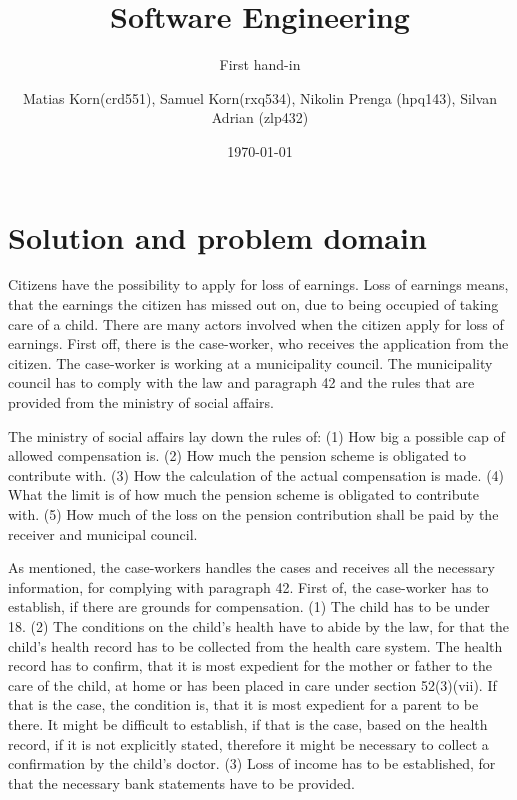 \documentclass{article}
\title{Software Engineering}
\subtitle{First hand-in}
\author{Matias Korn(crd551), Samuel Korn(rxq534), Nikolin Prenga (hpq143), Silvan Adrian (zlp432)}
\date{\today}
\begin{document}
\maketitle

\section{Solution and problem domain}
Citizens have the possibility to apply for loss of earnings. Loss of earnings means, that the earnings the citizen has missed out on, due to being occupied of taking care of a child. There are many actors involved when the citizen apply for loss of earnings. First off, there is the case-worker, who receives the application from the citizen. The case-worker is working at a municipality council. The municipality council has to comply with the law and paragraph 42 and the rules that are provided from the ministry of social affairs.

\vspace{2mm}

The ministry of social affairs lay down the rules of:
(1) How big a possible cap of allowed compensation is.
(2) How much the pension scheme is obligated to contribute with. (3) How the calculation of the actual compensation is made. (4) What the limit is of how much the pension scheme is obligated to contribute with. (5) How much of the loss on the pension contribution shall be paid by the receiver and municipal council.

\vspace{2mm}

As mentioned, the case-workers handles the cases and receives all the necessary information, for complying with paragraph 42. First of, the case-worker has to establish, if there are grounds for compensation. (1) The child has to be under 18. (2) The conditions on the child's health have to abide by the law, for that the child's health record has to be collected from the health care system. The health record has to confirm, that it is most expedient for the mother or father to the care of the child, at home or has been placed in care under section 52(3)(vii). If that is the case, the condition is, that it is most expedient for a parent to be there. It might be difficult to establish, if that is the case, based on the health record, if it is not explicitly stated, therefore it might be necessary to collect a confirmation by the child's doctor. (3) Loss of income has to be established, for that the necessary bank statements have to be provided.
\end{document}
